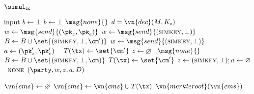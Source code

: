 \begin{simulator}{$\simul_{\mathsf{zc}}$}
\begin{receive}{input}{\tx}
          \State \Let $b \gets \bot$
        \EndIf
          \Let $b \gets \bot$
        \EndIf
          \Return $\msg{none}{}$
        \EndIf
          \State \Let $d = \vn{dec}(M, K_e)$
            \State \Let $w \gets \msg{send}{(\pk_z, \pk_e)}$
          \Else
            \State \Let $w \gets \msg{send}{(\textsc{simkey}, \bot)}$
          \EndIf
        \Else
          \State \Let $B \gets B \cup \set{(\textsc{simkey}, \bot, \cm')}$
          \State \Let $w \gets \msg{send}{(\textsc{simkey}, \bot)}$
        \EndIf
          \State \Let $a \gets (\pk_z', \pk_e')$
        \Else
          ~\Abort
        \EndIf
        \State \Let $T(\tx) \gets \set{\cm'}$
        \State \Let $z \gets \varnothing$
      \Else
        ~\Return $\msg{none}{}$
      \EndIf
      \State \Let $B \gets B \cup \set{(\textsc{simkey}, \bot, \cm)}$
      \State \Let $T(\tx) \gets \set{\cm'}$
      \State \Let $z \gets (\textsc{simkey}, \bot); a \gets \varnothing$
    \Else
      ~\Return $\textsc{none}$
    \EndIf
    \State \Return $(\party, w, z, a, D)$
  \end{receive}

  \begin{helpers}
      \State \Let $\vn{cms} \gets \varnothing$
      \State {}
      \For{$\tx \in \ledgerstate[{:}t]$}
        \State \Let $\vn{cms} \gets \vn{cms} \cup T(\tx)$
      \EndFor
      \State \Return $\vn{merkleroot}(\vn{cms})$
    \EndProcedure
  \end{helpers}
\end{simulator}

